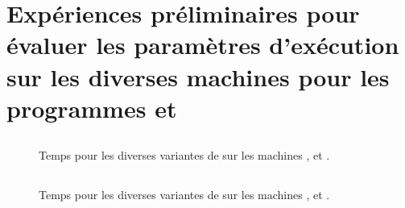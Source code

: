
\chapter{Expériences préliminaires pour évaluer les paramètres
d'exécution sur les diverses machines pour les programmes
 et }

\section{}

\label{wordcount-java.ann}


\begin{figure}

\caption{Temps pour les diverses variantes de  sur
les machines ,  et .}
\label{preliminaires-wordcount-java.fig}
\end{figure}



\newpage
\section{}

\label{stockprice-java.ann}


\begin{figure}

\caption{Temps pour les diverses variantes de  sur
les machines ,  et .}
\label{preliminaires-stockprice-java.fig}
\end{figure}

